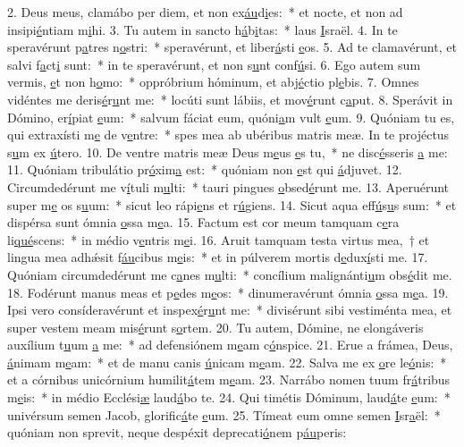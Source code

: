 2. Deus meus, clamábo per diem, et non ex\uline{áu}d\uline{i}es:~* et nocte, et non ad insipi\uline{é}ntiam m\uline{i}hi.
3. Tu autem in sancto h\uline{á}b\uline{i}tas:~* laus \uline{I}sraël.
4. In te speravérunt p\uline{a}tres n\uline{o}stri:~* speravérunt, et liber\uline{á}sti \uline{e}os.
5. Ad te clamavérunt, et salvi f\uline{a}ct\uline{i} sunt:~* in te speravérunt, et non s\uline{u}nt conf\uline{ú}si.
6. Ego autem sum vermis, \uline{e}t non h\uline{o}mo:~* oppróbrium hóminum, et abj\uline{é}ctio pl\uline{e}bis.
7. Omnes vidéntes me deris\uline{é}r\uline{u}nt me:~* locúti sunt lábiis, et mov\uline{é}runt c\uline{a}put.
8. Sperávit in Dómino, er\uline{í}piat \uline{e}um:~* salvum fáciat eum, quóni\uline{a}m vult \uline{e}um.
9. Quóniam tu es, qui extraxísti m\uline{e} de v\uline{e}ntre:~* spes mea ab ubéribus matris meæ. In te projéctus s\uline{u}m ex \uline{ú}tero.
10. De ventre matris meæ Deus m\uline{e}us \uline{e}s tu,~* ne disc\uline{é}sseris \uline{a} me:
11. Quóniam tribulátio pr\uline{ó}xim\uline{a} est:~* quóniam non \uline{e}st qui \uline{á}djuvet.
12. Circumdedérunt me v\uline{í}tuli m\uline{u}lti:~* tauri pingues \uline{o}bsed\uline{é}runt me.
13. Aperuérunt super m\uline{e} os s\uline{u}um:~* sicut leo rápi\uline{e}ns et r\uline{ú}giens.
14. Sicut aqua eff\uline{ú}s\uline{u}s sum:~* et dispérsa sunt ómnia \uline{o}ssa m\uline{e}a.
15. Factum est cor meum tamquam c\uline{e}ra li\uline{qué}scens:~* in médio v\uline{e}ntris m\uline{e}i.
16. Aruit tamquam testa virtus mea,~† et lingua mea adhǽsit f\uline{áu}cibus m\uline{e}is:~* et in púlverem mortis d\uline{e}dux\uline{í}sti me.
17. Quóniam circumdedérunt me c\uline{a}nes m\uline{u}lti:~* concílium malignánti\uline{u}m obs\uline{é}dit me.
18. Fodérunt manus meas et p\uline{e}des m\uline{e}os:~* dinumeravérunt ómnia \uline{o}ssa m\uline{e}a.
19. Ipsi vero consíderavérunt et inspex\uline{é}r\uline{u}nt me:~* divisérunt sibi vestiménta mea, et super vestem meam mis\uline{é}runt s\uline{o}rtem.
20. Tu autem, Dómine, ne elongáveris auxílium t\uline{u}um \uline{a} me:~* ad defensiónem m\uline{e}am c\uline{ó}nspice.
21. Erue a frámea, Deus, \uline{á}nimam m\uline{e}am:~* et de manu canis \uline{ú}nicam m\uline{e}am.
22. Salva me ex \uline{o}re le\uline{ó}nis:~* et a córnibus unicórnium humilit\uline{á}tem m\uline{e}am.
23. Narrábo nomen tuum fr\uline{á}tribus m\uline{e}is:~* in médio Ecclési\uline{æ} laud\uline{á}bo te.
24. Qui timétis Dóminum, laud\uline{á}te \uline{e}um:~* univérsum semen Jacob, glorific\uline{á}te \uline{e}um.
25. Tímeat eum omne semen \uline{I}sr\uline{a}ël:~* quóniam non sprevit, neque despéxit deprecati\uline{ó}nem p\uline{áu}peris:
